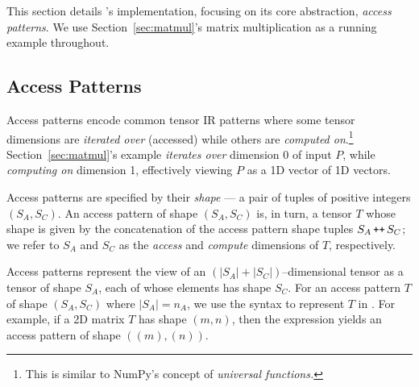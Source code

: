 This section details \g's implementation,
  focusing on its core abstraction,
  \textit{access patterns}.
We use Section~\ref{sec:matmul}'s
  matrix multiplication as a
  running example throughout.
  

\subsection{Access Patterns}


Access patterns encode common
  tensor IR patterns where
  some tensor dimensions
  are \textit{iterated over} (accessed)
  while others are \textit{computed on}.\footnote{
    This is similar to NumPy's concept of \textit{universal functions.}}
Section~\ref{sec:matmul}'s  example
  \textit{iterates over} dimension 0 of input $P$,
  while \textit{computing on} dimension 1,
  effectively viewing $P$ as a 1D vector of 1D vectors.

Access patterns are specified by their \textit{shape} ---
  a pair of tuples of positive integers $(S_A, S_C)$.
An access pattern of shape $(S_A, S_C)$ is, in turn, a
  tensor $T$ whose shape is given by the
  concatenation of the access pattern shape tuples
  $S_A \,\mathrm{\texttt{++}}\, S_C$; we refer to
  $S_A$ and $S_C$ as the \textit{access} and
  \textit{compute}
  dimensions of $T$, respectively.

Access patterns represent the view of an
  $(|S_A| + |S_C|)$--dimensional tensor
  as a tensor of shape $S_A$,
  each of whose elements has shape $S_C$.
For an access pattern $T$ of shape $(S_A, S_C)$
  where $|S_A| = n_A$, we use the syntax
   to represent $T$ in \g.
For example, if a 2D matrix $T$ has shape $(m, n)$,
  then the \g expression 
  yields an access pattern of shape $((m), (n))$.
  

